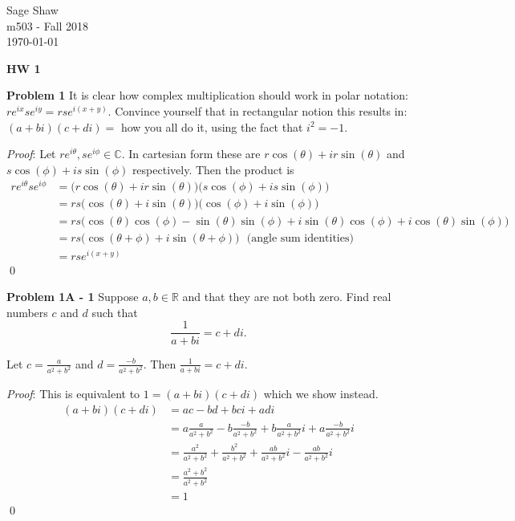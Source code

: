 \documentclass[12pt]{article}
\newcommand{\problem}[1]{\hspace{-4 ex} \large \textbf{Problem #1} }
\renewenvironment{proof}{\hspace{-4 ex} \emph{Proof}:}{\qed}
\newcommand{\RR}{\mathbb{R}}
\newcommand{\CC}{\mathbb{C}}
\begin{document}
	\thispagestyle{empty}
	
	\begin{flushright}
		Sage Shaw \\
		m503 - Fall 2018 \\
		\today
	\end{flushright}
	
{\large \textbf{HW 1}}
\bigbreak

\problem{1} It is clear how complex multiplication should work in polar notation: $re^{ix}se^{iy}=rse^{i(x+y)}$. Convince yourself that in rectangular notion this results in: $(a+bi)(c+di)=$ how you all do it, using the fact that $i^2=-1$.

\begin{proof}
	Let $re^{i\theta}, se^{i\phi} \in \CC$. In cartesian form these are $r\cos(\theta) + ir\sin(\theta)$ and $s\cos(\phi) + is\sin(\phi)$ respectively. Then the product is
	\begin{align*}
		re^{i\theta}se^{i\phi} & = \big(r\cos(\theta) + ir\sin(\theta) \big) \big(s\cos(\phi) + is\sin(\phi) \big) \\
		& = rs \big(\cos(\theta) + i\sin(\theta)\big)\big(\cos(\phi) + i\sin(\phi)\big) \\
		& = rs \big( \cos(\theta)\cos(\phi) - \sin(\theta)\sin(\phi) + i\sin(\theta)\cos(\phi) + i \cos(\theta)\sin(\phi) \big) \\
		& = rs \big(\cos(\theta + \phi) + i \sin(\theta + \phi)\big) \ \ \ \text{(angle sum identities)} \\
		& = rse^{i(x+y)}
	\end{align*}
\end{proof}

\bigbreak
\problem{1A - 1} Suppose $a, b \in \RR$ and that they are not both zero. Find real numbers $c$ and $d$ such that $$\frac{1}{a+bi} = c+di \text{.}$$

	Let $c = \frac{a}{a^2+b^2}$ and $d = \frac{-b}{a^2+b^2}$. Then $\frac{1}{a+bi} = c+di$. \bigbreak
	
	\begin{proof}
		This is equivalent to $1 = (a+bi)(c+di)$ which we show instead.
		\begin{align*}
			(a+bi)(c+di) &= ac - bd + bci + adi \\
				&= a\frac{a}{a^2+b^2} - b\frac{-b}{a^2+b^2} + b\frac{a}{a^2+b^2}i + a\frac{-b}{a^2+b^2}i \\
				&= \frac{a^2}{a^2+b^2} + \frac{b^2}{a^2+b^2} + \frac{ab}{a^2+b^2}i - \frac{ab}{a^2+b^2}i \\
				& = \frac{a^2 + b^2}{a^2+b^2} \\
				& = 1
		\end{align*}
	\end{proof} 
\end{document}
